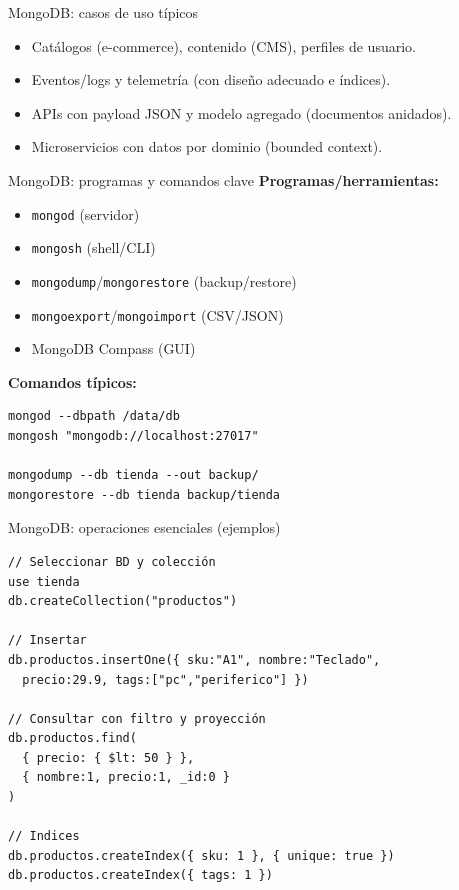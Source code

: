 \documentclass{beamer}
\begin{document}
\begin{frame}{MongoDB: casos de uso típicos}
\begin{itemize}
  \item Catálogos (e-commerce), contenido (CMS), perfiles de usuario.
  \item Eventos/logs y telemetría (con diseño adecuado e índices).
  \item APIs con payload JSON y modelo agregado (documentos anidados).
  \item Microservicios con datos por dominio (bounded context).
\end{itemize}
\end{frame}

\begin{frame}[fragile]{MongoDB: programas y comandos clave}
\textbf{Programas/herramientas:}
\begin{itemize}
  \item \texttt{mongod} (servidor)
  \item \texttt{mongosh} (shell/CLI)
  \item \texttt{mongodump}/\texttt{mongorestore} (backup/restore)
  \item \texttt{mongoexport}/\texttt{mongoimport} (CSV/JSON)
  \item MongoDB Compass (GUI)
\end{itemize}

\textbf{Comandos típicos:}
\begin{verbatim}
mongod --dbpath /data/db
mongosh "mongodb://localhost:27017"

mongodump --db tienda --out backup/
mongorestore --db tienda backup/tienda
\end{verbatim}
\end{frame}

\begin{frame}[fragile]{MongoDB: operaciones esenciales (ejemplos)}
\begin{verbatim}
// Seleccionar BD y colección
use tienda
db.createCollection("productos")

// Insertar
db.productos.insertOne({ sku:"A1", nombre:"Teclado",
  precio:29.9, tags:["pc","periferico"] })

// Consultar con filtro y proyección
db.productos.find(
  { precio: { $lt: 50 } },
  { nombre:1, precio:1, _id:0 }
)

// Indices
db.productos.createIndex({ sku: 1 }, { unique: true })
db.productos.createIndex({ tags: 1 })
\end{verbatim}
\end{frame}
\end{document}

